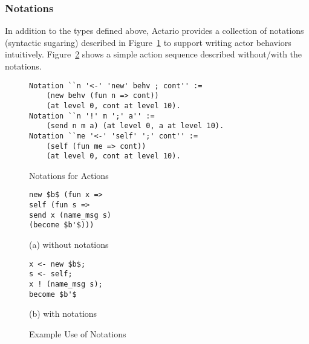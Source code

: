 \subsubsection{Notations}

In addition to the types defined above, Actario provides a collection
of notations (syntactic sugaring) described in
Figure~\ref{coq:notation} to support writing actor behaviors
intuitively.  Figure~\ref{fig:notationexample} shows a simple action
sequence described without/with the notations.

\begin{figure}
\begin{lstlisting}
Notation ``n '<-' 'new' behv ; cont'' :=
    (new behv (fun n => cont))
    (at level 0, cont at level 10).
Notation ``n '!' m ';' a'' :=
    (send n m a) (at level 0, a at level 10).
Notation ``me '<-' 'self' ';' cont'' :=
    (self (fun me => cont))
    (at level 0, cont at level 10).
\end{lstlisting}
\caption{Notations for Actions}\label{coq:notation}
\end{figure}

\begin{figure}\centering
\begin{minipage}{0.2\textwidth}\centering
\begin{lstlisting}[frame=single]
new $b$ (fun x =>
self (fun s =>
send x (name_msg s)
(become $b'$)))
\end{lstlisting}
(a) without notations
\end{minipage}
\hspace*{3ex}
\begin{minipage}{0.2\textwidth}\centering
\begin{lstlisting}[frame=single]
x <- new $b$;
s <- self;
x ! (name_msg s);
become $b'$
\end{lstlisting}
(b) with notations
\end{minipage}
\caption{Example Use of Notations}\label{fig:notationexample}
\end{figure}

